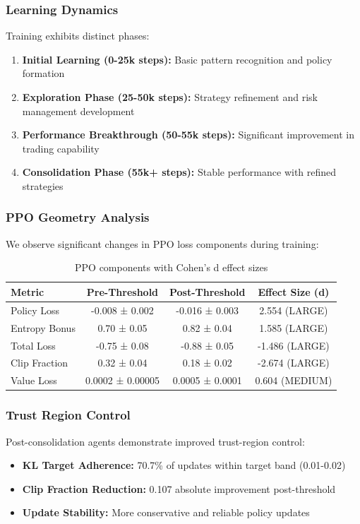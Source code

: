 \documentclass[10pt,journal]{IEEEtran}
\begin{document}
\subsubsection{Learning Dynamics}
Training exhibits distinct phases:
\begin{enumerate}
\item \textbf{Initial Learning (0-25k steps):} Basic pattern recognition and policy formation
\item \textbf{Exploration Phase (25-50k steps):} Strategy refinement and risk management development
\item \textbf{Performance Breakthrough (50-55k steps):} Significant improvement in trading capability
\item \textbf{Consolidation Phase (55k+ steps):} Stable performance with refined strategies
\end{enumerate}

\subsubsection{PPO Geometry Analysis}
We observe significant changes in PPO loss components during training:

\begin{table}[h]
\centering
\begin{tabular}{lccc}
\toprule
\textbf{Metric} & \textbf{Pre-Threshold} & \textbf{Post-Threshold} & \textbf{Effect Size (d)} \\
\midrule
Policy Loss & -0.008 ± 0.002 & -0.016 ± 0.003 & 2.554 (LARGE) \\
Entropy Bonus & 0.70 ± 0.05 & 0.82 ± 0.04 & 1.585 (LARGE) \\
Total Loss & -0.75 ± 0.08 & -0.88 ± 0.05 & -1.486 (LARGE) \\
Clip Fraction & 0.32 ± 0.04 & 0.18 ± 0.02 & -2.674 (LARGE) \\
Value Loss & 0.0002 ± 0.00005 & 0.0005 ± 0.0001 & 0.604 (MEDIUM) \\
\bottomrule
\end{tabular}
\caption{PPO components with Cohen's d effect sizes}
\end{table}

\subsubsection{Trust Region Control}
Post-consolidation agents demonstrate improved trust-region control:
\begin{itemize}
\item \textbf{KL Target Adherence:} 70.7\% of updates within target band (0.01-0.02)
\item \textbf{Clip Fraction Reduction:} 0.107 absolute improvement post-threshold
\item \textbf{Update Stability:} More conservative and reliable policy updates
\end{itemize}
\end{document}
